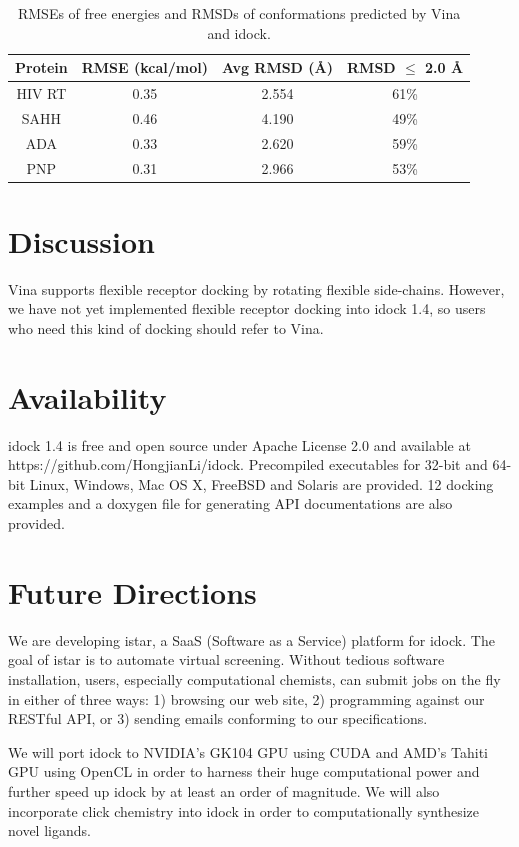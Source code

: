 \documentclass[10pt,conference,compsocconf]{../IEEEtran}
\begin{document}
\begin{table}
\centering
\begin{tabular*}
{\linewidth}
{@{\extracolsep{\fill}}cccc}
\toprule
Protein & RMSE (kcal/mol) & Avg RMSD (\AA) & RMSD $\leq$ 2.0 \AA\\
\midrule
HIV RT & 0.35 & 2.554 & 61\%\\
SAHH   & 0.46 & 4.190 & 49\%\\
ADA    & 0.33 & 2.620 & 59\%\\
PNP    & 0.31 & 2.966 & 53\%\\
\bottomrule
\end{tabular*}
\caption{RMSEs of free energies and RMSDs of conformations predicted by Vina and idock.}
\label{tab:RMSEAndRMSD}
\end{table}

\section{Discussion}

Vina supports flexible receptor docking by rotating flexible side-chains. However, we have not yet implemented flexible receptor docking into idock 1.4, so users who need this kind of docking should refer to Vina.

\section{Availability}

idock 1.4 is free and open source under Apache License 2.0 and available at https://github.com/HongjianLi/idock. Precompiled executables for 32-bit and 64-bit Linux, Windows, Mac OS X, FreeBSD and Solaris are provided. 12 docking examples and a doxygen file for generating API documentations are also provided.

\section{Future Directions}

We are developing istar, a SaaS (Software as a Service) platform for idock. The goal of istar is to automate virtual screening. Without tedious software installation, users, especially computational chemists, can submit jobs on the fly in either of three ways: 1) browsing our web site, 2) programming against our RESTful API, or 3) sending emails conforming to our specifications.

We will port idock to NVIDIA's GK104 GPU using CUDA and AMD's Tahiti GPU using OpenCL in order to harness their huge computational power and further speed up idock by at least an order of magnitude. We will also incorporate click chemistry into idock in order to computationally synthesize novel ligands.



\end{document}
